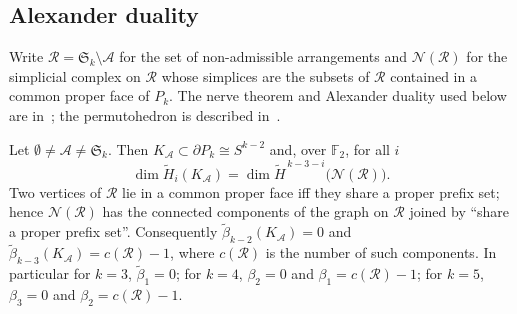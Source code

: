 \subsection{Alexander duality}
Write $\mathcal R=\mathfrak S_k\setminus\mathcal A$ for the set of non-admissible arrangements and $\mathcal N(\mathcal R)$ for the simplicial complex on $\mathcal R$ whose simplices are the subsets of $\mathcal R$ contained in a common proper face of $P_k$.
The nerve theorem and Alexander duality used below are in~\cite{Hatcher2002}; the permutohedron is described in~\cite{Ziegler1995}.
\begin{theorem}\label{thm:dual}
Let $\emptyset\ne\mathcal A\ne\mathfrak S_k$. Then $K_{\mathcal A}\subset\partial P_k\cong S^{k-2}$ and, over $\mathbb F_2$, for all $i$
\[
 \dim\tilde H_i(K_{\mathcal A})=\dim\tilde H^{\,k-3-i}\bigl(\mathcal N(\mathcal R)\bigr).
\]
Two vertices of $\mathcal R$ lie in a common proper face iff they share a proper prefix set; hence $\mathcal N(\mathcal R)$ has the connected components of the graph on $\mathcal R$ joined by ``share a proper prefix set''. Consequently $\tilde\beta_{k-2}(K_{\mathcal A})=0$ and $\tilde\beta_{k-3}(K_{\mathcal A})=c(\mathcal R)-1$, where $c(\mathcal R)$ is the number of such components. In particular for $k=3$, $\tilde\beta_1=0$; for $k=4$, $\beta_2=0$ and $\beta_1=c(\mathcal R)-1$; for $k=5$, $\beta_3=0$ and $\beta_2=c(\mathcal R)-1$.
\end{theorem}

